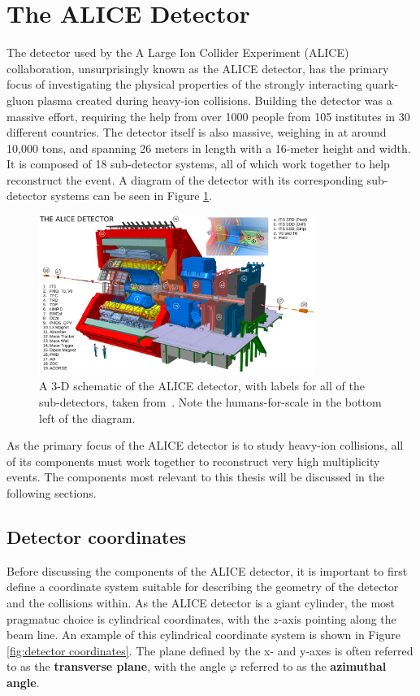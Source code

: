 \section{The ALICE Detector}
The detector used by the A Large Ion Collider Experiment (ALICE) collaboration, unsurprisingly known as the ALICE detector, has the primary focus of investigating the physical properties of the strongly interacting quark-gluon plasma created during heavy-ion collisions.
Building the detector was a massive effort, requiring the help from over 1000 people from 105 institutes in 30 different countries. 
The detector itself is also massive, weighing in at around 10,000 tons, and spanning 26 meters in length with a 16-meter height and width.
It is composed of 18 sub-detector systems, all of which work together to help reconstruct the event.
A diagram of the detector with its corresponding sub-detector systems can be seen in Figure \ref{fig:alice_detector}.
\begin{figure}
    \centering
    \includegraphics[width=0.8\textwidth]{figures/experiment/ALICE_detector_schematic.png}
    \caption{A 3-D schematic of the ALICE detector, with labels for all of the sub-detectors, taken from~\cite{ALICEDiagram}. Note the humans-for-scale in the bottom left of the diagram.}
    \label{fig:alice_detector}
\end{figure}
As the primary focus of the ALICE detector is to study heavy-ion collisions, all of its components must work together to reconstruct very high multiplicity events. The components most relevant to this thesis will be discussed in the following sections.

\subsection{Detector coordinates}
Before discussing the components of the ALICE detector, it is important to first define a coordinate system suitable for describing the geometry of the detector and the collisions within. As the ALICE detector is a giant cylinder, the most pragmatuc choice is cylindrical coordinates, with the $z$-axis pointing along the beam line. An example of this cylindrical coordinate system is shown in Figure \ref{fig:detector coordinates}. The plane defined by the x- and y-axes is often referred to as the \textbf{transverse plane}, with the angle $\varphi$ referred to as the \textbf{azimuthal angle}.

